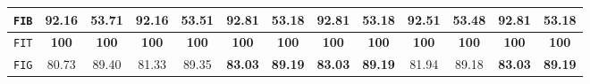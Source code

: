 \begin{sidewaystable}[htpb]
\begin{tabular}{| c | c c | c c | c c | c c | c c | c c |}
                \hline
                \texttt{FIB} & \textbf{92.16} & \textbf{53.71} & 92.16 & 53.51 & 92.81 & 53.18 & 92.81 & 53.18 & 92.51 & 53.48 & 92.81 & 53.18 \\
                \hline
                \texttt{FIT} & \textbf{100} & \textbf{100} & \textbf{100} & \textbf{100} & \textbf{100} & \textbf{100} & \textbf{100} & \textbf{100} & \textbf{100} & \textbf{100} & \textbf{100} & \textbf{100} \\
                \hline
                \texttt{FIG} & 80.73 & 89.40 & 81.33 & 89.35 & \textbf{83.03} & \textbf{89.19} & \textbf{83.03} & \textbf{89.19} & 81.94 & 89.18 & \textbf{83.03} & \textbf{89.19} \\
                \hline
            \end{tabular}
            \caption{
                \label{tab::stats_gk_scat_svm_f3}
                \gls{acr::svm} results using graph kernels and \glspl{acr::scatnet}, expressed in percentage, on the two datasets at \textbf{\gls{acr::efin}} level 3.
            }
        \end{sidewaystable}

